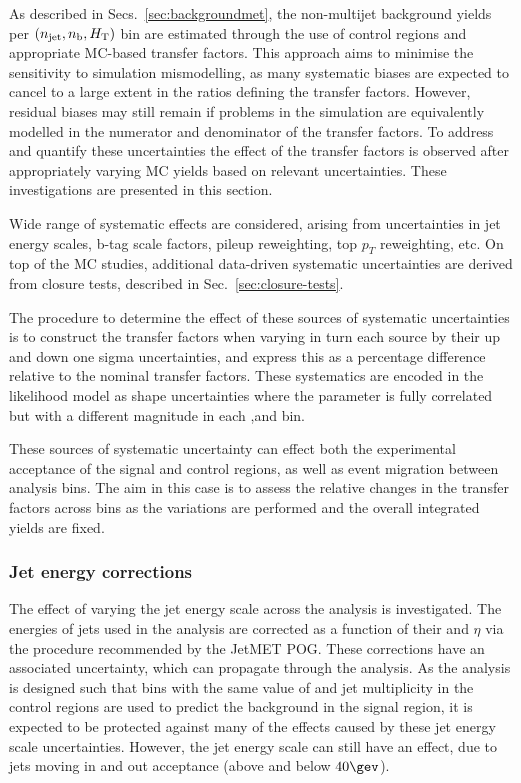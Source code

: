 As described in Secs.~\ref{sec:backgroundmet}, the non-multijet background yields
per $(\njet,\nb,\scalht)$ bin are estimated through the use of control
regions and appropriate MC-based transfer factors. This approach aims
to minimise the sensitivity to simulation mismodelling, as many
systematic biases are expected to cancel to a large extent in the
ratios defining the transfer factors. However, residual biases may
still remain if problems in the simulation are equivalently modelled
in the numerator and denominator of the transfer factors. To address
and quantify these uncertainties the effect of the transfer factors is
observed after appropriately varying MC yields based on relevant
uncertainties. These investigations are presented in this section. 

Wide range of systematic effects are considered, arising from
uncertainties in jet energy scales, b-tag scale factors, pileup
reweighting, top $p_T$ reweighting, etc. 
On top of the MC studies, additional data-driven systematic 
uncertainties are derived from closure tests, described in
Sec.~\ref{sec:closure-tests}.

The procedure to determine the effect of these sources of systematic
uncertainties is to construct the transfer factors when varying in
turn each source by their up and down one sigma uncertainties, and
express this as a percentage difference relative to the nominal
transfer factors. These systematics are encoded in the likelihood
model as shape uncertainties where the parameter is fully correlated
but with a different magnitude in each \njet,\nb and \scalht bin.

These sources of systematic uncertainty can effect both the
experimental acceptance of the signal and control regions, as well as
event migration between analysis bins. 
The aim in this case is to assess the relative changes in the transfer
factors across bins as the variations are performed and the overall
integrated yields are fixed.

\subsubsection{Jet energy corrections}

The effect of varying the jet energy scale across the analysis
is investigated.  The energies of
jets used in the analysis are corrected as a function of their \pt and
$\eta$ via the procedure recommended by the JetMET POG. These
corrections have an associated uncertainty, which can propagate
through the analysis.  As the analysis is designed such that bins with
the same value of \scalht and jet multiplicity in the control regions
are used to predict the background in the signal region, it is
expected to be protected against many of the effects caused by these jet energy
scale uncertainties. However, the jet energy scale can still have an
effect, due to jets moving in and out acceptance (above and below
$40\gev$).

